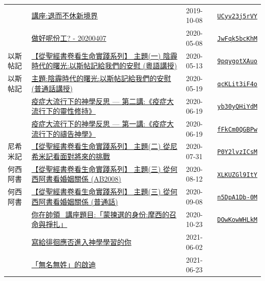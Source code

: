 \documentclass{book}
\begin{document}
{ \scriptsize


\begin{xltabular}{\textwidth}{|p{0.15\textwidth} p{0.6\textwidth}|p{0.07\textwidth} p{0.1\textwidth}|}
\hline
    & \hyperref[sec:UCyv23j5rVY]{講座:退而不休新境界} & 2019-10-08 & \href{https://youtube.com/watch?v=UCyv23j5rVY}{\texttt{UCyv23j5rVY}} \\
    & \hyperref[sec:JwFqk5bcKhM]{做好呢份工? - 20200407} & 2020-05-08 & \href{https://youtube.com/watch?v=JwFqk5bcKhM}{\texttt{JwFqk5bcKhM}} \\
以斯帖記   & \hyperref[sec:9pqygotXAuo]{【從聖經書卷看生命實踐系列】 主題(一) 陰霾時代的曙光:以斯帖記給我們的安慰 (粵語講授)} & 2020-05-13 & \href{https://youtube.com/watch?v=9pqygotXAuo}{\texttt{9pqygotXAuo}} \\
以斯帖記   & \hyperref[sec:qcKLit3iF4o]{主題:陰霾時代的曙光:以斯帖記給我們的安慰 (普通話講授)} & 2020-05-19 & \href{https://youtube.com/watch?v=qcKLit3iF4o}{\texttt{qcKLit3iF4o}} \\
    & \hyperref[sec:yb30yQHiYdM]{疫症大流行下的神學反思 --- 第二講:《疫症大流行下的靈性修持》} & 2020-06-19 & \href{https://youtube.com/watch?v=yb30yQHiYdM}{\texttt{yb30yQHiYdM}} \\
    & \hyperref[sec:fFkCm0QGBPw]{疫症大流行下的神學反思 --- 第一講:《疫症大流行下的禱告神學》} & 2020-06-19 & \href{https://youtube.com/watch?v=fFkCm0QGBPw}{\texttt{fFkCm0QGBPw}} \\
尼希米記   & \hyperref[sec:P0Y2lvzICsM]{【從聖經書卷看生命實踐系列】 主題(二) 從尼希米記看面對將來的挑戰} & 2020-07-31 & \href{https://youtube.com/watch?v=P0Y2lvzICsM}{\texttt{P0Y2lvzICsM}} \\
何西阿書   & \hyperref[sec:XLKUZGl9ItY]{【從聖經書卷看生命實踐系列】 主題(三) 從何西阿書看婚姻關係 (AB2008)} & 2020-08-12 & \href{https://youtube.com/watch?v=XLKUZGl9ItY}{\texttt{XLKUZGl9ItY}} \\
何西阿書   & \hyperref[sec:n5DpA1Db_0M]{【從聖經書卷看生命實踐系列】 主題(三) 從何西阿書看婚姻關係 (普通話)} & 2020-09-08 & \href{https://youtube.com/watch?v=n5DpA1Db-0M}{\texttt{n5DpA1Db-0M}} \\
    & \hyperref[sec:DOwKowWHLkM]{你在帥領\_講座題目:「蒙揀選的身份:摩西的召命與掙扎」} & 2020-10-23 & \href{https://youtube.com/watch?v=DOwKowWHLkM}{\texttt{DOwKowWHLkM}} \\
    & \hyperref[sec:0]{寫給徘徊應否進入神學學習的你} & 2021-06-02 &  \\
    & \hyperref[sec:1]{「無名無姓」的啟迪} & 2021-06-23 &  \\

\end{xltabular}}
\end{document}
